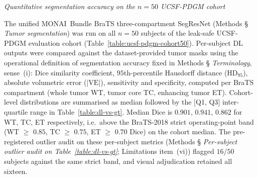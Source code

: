 \documentclass[a4paper,11pt,leqno]{article}
\begin{document}
\vspace{2mm}

\noindent \emph{Quantitative segmentation accuracy on the $n=50$
UCSF-PDGM cohort}

\vspace{2mm}

The unified MONAI~Bundle BraTS three-compartment SegResNet
(Methods § \emph{Tumor segmentation}) was run on all $n=50$ subjects
of the leak-safe UCSF-PDGM evaluation cohort
(Table~\ref{table:ucsf-pdgm-cohort50}). Per-subject DL outputs were
compared against the dataset-provided tumor masks using the
operational definition of segmentation accuracy fixed in Methods §
\emph{Terminology}, sense~(i): Dice similarity coefficient, $95$th-percentile
Hausdorff distance (HD$_{95}$), absolute volumetric error
($|\mathrm{VE}|$), sensitivity and specificity, computed per BraTS
compartment (whole tumor WT, tumor core TC, enhancing tumor ET).
Cohort-level distributions are summarised as median followed by the
$[$Q1, Q3$]$ inter-quartile range in Table~\ref{table:dl-vs-gt}.
Median Dice is $0.901$, $0.941$, $0.862$ for WT, TC, ET respectively,
i.e.\ above the BraTS-2018 strict operating-point band (WT $\geq$ $0.85$,
TC $\geq$ $0.75$, ET $\geq$ $0.70$ Dice) on the cohort median. The
pre-registered outlier audit on these per-subject metrics (Methods §
\emph{Per-subject outlier audit on Table~\ref{table:dl-vs-gt}};
Limitations item~(vi)) flagged $16/50$ subjects against the same
strict band, and visual adjudication retained all sixteen.

\begin{table}[H]
\centering

\vspace{2mm}
\caption{\textbf{Per-subject segmentation accuracy of the unified
MONAI~Bundle pipeline against the UCSF-PDGM reference masks ($n=50$).}
Each cell reports the cohort-level median followed by the
$[$Q1, Q3$]$ inter-quartile range across $n=50$ subjects. WT, TC, ET
refer to the BraTS subregions (whole tumor, tumor core, enhancing
tumor). HD$_{95}$ in millimetres, $|\mathrm{VE}|$ (absolute
volumetric error) in cubic millimetres. Per-voxel specificity is reported for completeness but saturates at
$1.000$ in every cell: the denominator
$\mathrm{TN}+\mathrm{FP}$ is dominated by non-tumour brain voxels
($\sim\!10^6$ background vs.\ $\sim\!10^3$ false positives per
subject), so even substantially over-segmenting predictions round
to the same value and the metric is not discriminative for this task. Dice, HD$_{95}$, $|\mathrm{VE}|$, and sensitivity carry the
substantive comparison. The dataset-provided tumor
masks are treated as a \emph{reference} rather than ground truth
(Limitations item~(vi); the worst-case cross-segmenter
boundary-disagreement exemplar sub-0396 is discussed there).}
\label{table:dl-vs-gt}
\end{table}
\end{document}
